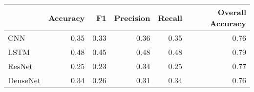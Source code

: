 \begin{tabular}{lrrrrr}
\toprule
{} &  Accuracy &    F1 &  Precision &  Recall &  Overall Accuracy \\
\midrule
CNN      &      0.35 &  0.33 &       0.36 &    0.35 &              0.76 \\
LSTM     &      0.48 &  0.45 &       0.48 &    0.48 &              0.79 \\
ResNet   &      0.25 &  0.23 &       0.34 &    0.25 &              0.77 \\
DenseNet &      0.34 &  0.26 &       0.31 &    0.34 &              0.76 \\
\bottomrule
\end{tabular}
